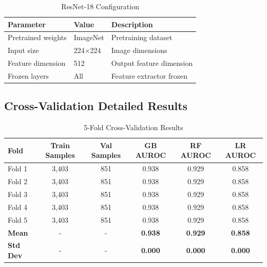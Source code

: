 \documentclass[12pt, a4paper]{article}
\begin{document}
\begin{table}[htbp]
\centering

\begin{tabular}{@{}lll@{}}
\toprule
\textbf{Parameter} & \textbf{Value} & \textbf{Description} \\ \midrule
Pretrained weights & ImageNet & Pretraining dataset \\
Input size & 224$\times$224 & Image dimensions \\
Feature dimension & 512 & Output feature dimension \\
Frozen layers & All & Feature extractor frozen \\ \bottomrule
\end{tabular}%

\caption{ResNet-18 Configuration}
\label{tab:resnet_config}
\end{table}

\subsection{Cross-Validation Detailed Results}
\begin{table}[htbp]
\centering

\begin{tabular}{@{}lccccc@{}}
\toprule
\textbf{Fold} & \textbf{Train Samples} & \textbf{Val Samples} & \textbf{GB AUROC} & \textbf{RF AUROC} & \textbf{LR AUROC} \\ \midrule
Fold 1 & 3,403 & 851 & 0.938 & 0.929 & 0.858 \\
Fold 2 & 3,403 & 851 & 0.938 & 0.929 & 0.858 \\
Fold 3 & 3,403 & 851 & 0.938 & 0.929 & 0.858 \\
Fold 4 & 3,403 & 851 & 0.938 & 0.929 & 0.858 \\
Fold 5 & 3,403 & 851 & 0.938 & 0.929 & 0.858 \\
\midrule
\textbf{Mean} & - & - & \textbf{0.938} & \textbf{0.929} & \textbf{0.858} \\
\textbf{Std Dev} & - & - & \textbf{0.000} & \textbf{0.000} & \textbf{0.000} \\ \bottomrule
\end{tabular}%

\caption{5-Fold Cross-Validation Results}
\label{tab:5fold_cv_detail}
\end{table}
\end{document}

